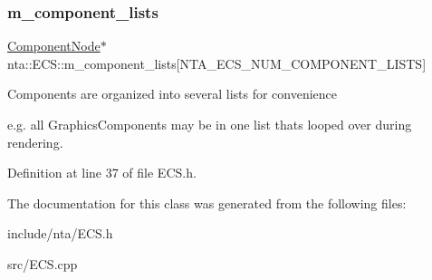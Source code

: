 \subsubsection{\texorpdfstring{m\+\_\+component\+\_\+lists}{m\_component\_lists}}
{\footnotesize\ttfamily \hyperlink{structnta_1_1utils_1_1LinkedNode}{Component\+Node}$\ast$ nta\+::\+E\+C\+S\+::m\+\_\+component\+\_\+lists\mbox{[}N\+T\+A\+\_\+\+E\+C\+S\+\_\+\+N\+U\+M\+\_\+\+C\+O\+M\+P\+O\+N\+E\+N\+T\+\_\+\+L\+I\+S\+TS\mbox{]}\hspace{0.3cm}{\ttfamily [private]}}

Components are organized into several lists for convenience

e.\+g. all Graphics\+Components may be in one list that\textquotesingle{}s looped over during rendering. 

Definition at line 37 of file E\+C\+S.\+h.



The documentation for this class was generated from the following files\+:\begin{DoxyCompactItemize}
\item 
include/nta/E\+C\+S.\+h\item 
src/E\+C\+S.\+cpp\end{DoxyCompactItemize}
